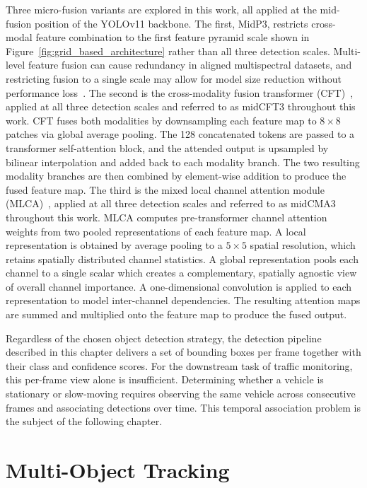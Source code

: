 \documentclass[12pt,oneside,bibtotoc,liststotoc]{scrbook}
\begin{document}
Three micro-fusion variants are explored in this work, all applied at the mid-fusion
position of the YOLOv11 backbone.
The first, MidP3, restricts cross-modal feature combination to the first feature
pyramid scale shown in Figure~\ref{fig:grid_based_architecture} rather than all
three detection scales.
Multi-level feature fusion can cause redundancy in aligned multispectral datasets,
and restricting fusion to a single scale may allow for model size reduction
without performance loss~\cite{wan2025yolov11rgbt}.
The second is the cross-modality fusion transformer
(CFT)~\cite{qingyun2021CFT}, applied at all three detection scales and referred
to as midCFT3 throughout this work.
CFT fuses both modalities by downsampling each feature map to $8{\times}8$
patches via global average pooling.
The 128 concatenated tokens are passed to a transformer self-attention block, and the
attended output is upsampled by bilinear interpolation and added back to each
modality branch.
The two resulting modality branches are then combined by element-wise addition
to produce the fused feature map.
The third is the mixed local channel attention module
(MLCA)~\cite{wan2023MLCA}, applied at all three detection scales
and referred to as midCMA3 throughout this work.
MLCA computes pre-transformer channel attention weights from two pooled representations of each
feature map.
A local representation is obtained by average pooling to a $5{\times}5$ spatial
resolution, which retains spatially distributed channel statistics.
A global representation pools each channel to a single scalar which creates a complementary,
spatially agnostic view of overall channel importance.
A one-dimensional convolution is applied to each representation to model
inter-channel dependencies.
The resulting attention maps are summed and multiplied onto the feature map to
produce the fused output.

Regardless of the chosen object detection strategy, the detection pipeline described in this chapter
delivers a set of bounding boxes per frame together with their class and confidence scores.
For the downstream task of traffic monitoring, this per-frame view alone is insufficient.
Determining whether a vehicle is stationary or slow-moving requires observing the same vehicle
across consecutive frames and associating detections over time.
This temporal association problem is the subject of the following chapter.

\chapter{Multi-Object Tracking}
\label{chap:tracking}
\end{document}
